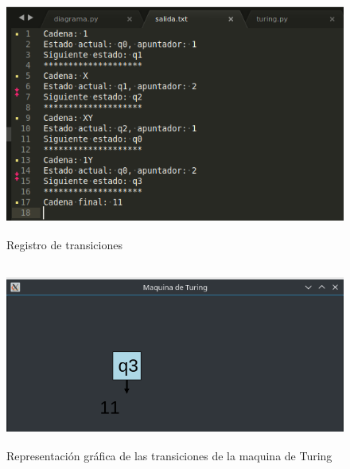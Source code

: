 \documentclass[a4paper,12pt]{article}
\begin{document}
\begin{figure}[H]
\begin{center}
 \includegraphics[width=13cm, height=8cm]{uno_historial.png}
 \caption{Registro de transiciones}
 \label{fig:uno_historial}
\end{center}
\end{figure}

\begin{figure}[H]
\begin{center}
 \includegraphics[width=13cm, height=6cm]{uno_grafica.png}
 \caption{Representación gráfica de las transiciones de la maquina de Turing}
 \label{fig:uno_grafica}
\end{center}
\end{figure}
\end{document}
